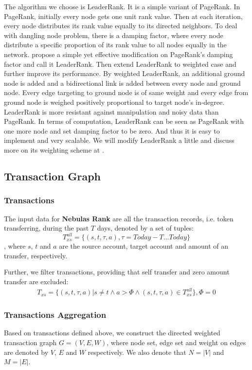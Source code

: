 The algorithm we choose is LeaderRank\cite{Chen2013}\cite{Li2014}. It is a simple variant of PageRank\cite{Brin2010}\cite{page1999pagerank}. In PageRank, initially every node gets one unit rank value. Then at each iteration, every node distributes its rank value equally to its directed neighbors. To deal with dangling node problem, there is a damping factor, where every node distribute a specific proportion of its rank value to all nodes equally in the network. \textcite{Chen2013} propose a simple yet effective modification on PageRank's damping factor and call it LeaderRank. Then \textcite{Li2014} extend LeaderRank to weighted case and further improve its performance. By weighted LeaderRank\cite{Li2014}, an additional ground node is added and a bidirectional link is added between every node and ground node. Every edge targeting to ground node is of same weight and every edge from ground node is weighed positively proportional to target node's in-degree. LeaderRank is more resistant against manipulation and noisy data than PageRank\cite{Chen2013}\cite{Li2014}\cite{Lu2016}. In terms of computation, LeaderRank can be seen as PageRank with one more node and set damping factor to be zero. And thus it is easy to implement and very scalable. We will modify LeaderRank a little and discuss more on its weighting scheme at .

\subsection{Transaction Graph} \label{sec:txg}

\subsubsection{Transactions}\label{subsec:transfer}
The input data for \textbf{Nebulas Rank} are all the transaction records, i.e. token transferring, during the past $T$ days, denoted by a set of tuples:
$$
	T_{xs}^{all} = \{(s,t,\tau, a), \tau = Today-T \dots Today \}
$$
, where $s$, $t$ and $a$ are the source account, target account and amount of an transfer, respectively.

Further, we filter transactions, providing that self transfer and zero amount transfer are excluded:
\begin{align}
	T_{xs} = \{(s,t,\tau, a)| s \neq t \land a > \Phi \land (s,t,\tau, a) \in T_{xs}^{all} \}, \Phi = 0
\end{align}

\subsubsection{Transactions Aggregation} \label{subsec:aggreate}
 Based on transactions defined above, we construct the directed weighted transaction graph $G=(V, E, W)$, where node set, edge set and weight on edges are denoted by $V$, $E$ and $W$ respectively. We also denote that $N = |V|$ and $M = |E|$.

